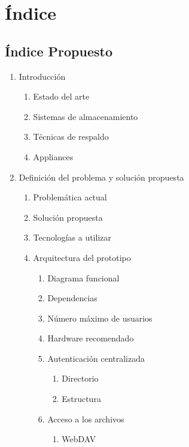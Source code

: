 \chapter{\'{I}ndice}
\label{chap:index}

\section{\'{I}ndice Propuesto}
{
\renewcommand{\labelenumi}{\arabic{enumi}.}
\renewcommand{\labelenumii}{\arabic{enumi}.\arabic{enumii}}
\renewcommand{\labelenumiii}{\arabic{enumi}.\arabic{enumii}.\arabic{enumiii}}
\renewcommand{\labelenumiv}{\arabic{enumi}.\arabic{enumii}.\arabic{enumiii}.\arabic{enumiv}}

\begin{enumerate}
  \item Introducci\'{o}n
  \begin{enumerate}
    \item Estado del arte
    \item Sistemas de almacenamiento
    \item T\'{e}cnicas de respaldo
    \item Appliances
  \end{enumerate}
  \item Definici\'{o}n del problema y soluci\'{o}n propuesta
  \begin{enumerate}
    \item Problem\'{a}tica actual
    \item Soluci\'{o}n propuesta
    \item Tecnolog\'{i}as a utilizar
    \item Arquitectura del prototipo
    \begin{enumerate}
      \item Diagrama funcional
      \item Dependencias
      \item N\'{u}mero m\'{a}ximo de usuarios
      \item Hardware recomendado
      \item Autenticaci\'{o}n centralizada
      \begin{enumerate}
        \item Directorio
        \item Estructura
      \end{enumerate}
      \item Acceso a los archivos
      \begin{enumerate}
        \item WebDAV

\end{enumerate}
\end{enumerate}
\end{enumerate}
\end{enumerate}}
